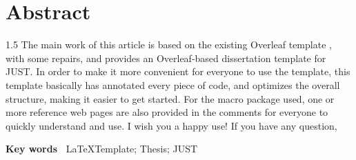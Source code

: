 \chapter[Abstract]{Abstract}
\begin{spacing}{1.5}
The main work of this article is based on the existing Overleaf template , with some repairs, and provides an Overleaf-based dissertation template for JUST.
In order to make it more convenient for everyone to use the template, 
this template basically has annotated every piece of code, and optimizes the overall structure, 
making it easier to get started.
For the macro package used, 
one or more reference web pages are also provided in the comments for everyone to quickly understand and use. I wish you a happy use! If you have any question,  
\end{spacing}

\textbf{Key words~} \LaTeX Template; Thesis; JUST

\clearpage									%

